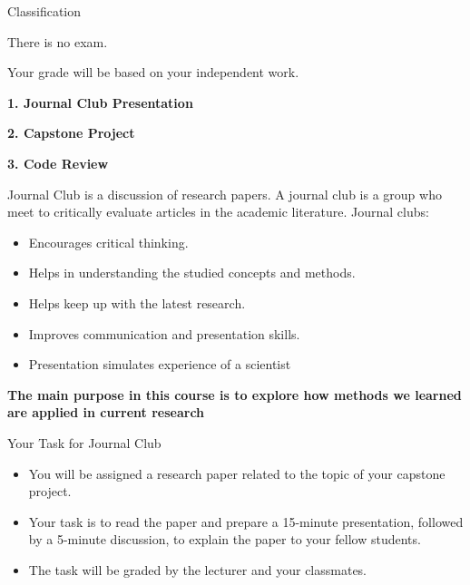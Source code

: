 \begin{frame}{Classification}
\begin{center}
    \Large
    There is no exam.
    
    \vspace{1em}
    Your grade will be based on your independent work.

    \vspace{1em}
    \color{primary}
    \textbf{1. Journal Club Presentation}
    
    \vspace{1em}
    \color{secondary}
    \textbf{2. Capstone Project} 

    \vspace{1em}
    \color{primary}
    \textbf{3. Code Review}
    
    
\end{center}
\end{frame}

\begin{frame}{Journal Club is a discussion of research papers.}
   A journal club is a group who meet to critically evaluate  articles in the academic literature. Journal clubs:
     \begin{itemize}
        \item Encourages critical thinking.
        \item Helps in understanding the studied concepts and methods.
        \item Helps keep up with the latest research.
        \item Improves communication and presentation skills.
        \item Presentation simulates experience of a scientist
    \end{itemize}
\vspace{1em}
\textbf{The main purpose in this course is to explore how methods we learned are applied in current research}
    
\end{frame}
\begin{frame}{Your Task for Journal Club}
    \begin{itemize}
        \item You will be assigned a research paper related to the topic of your capstone project.
        \item Your task is to read the paper and prepare a 15-minute presentation, followed by a 5-minute discussion, to explain the paper to your fellow students.
        \item The task will be graded by the lecturer and your classmates. 
    \end{itemize}
\end{frame}

